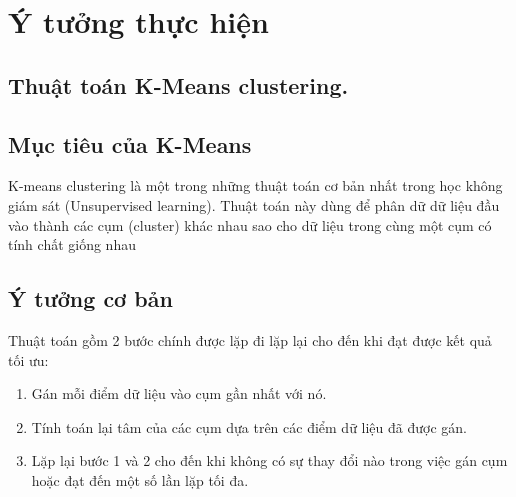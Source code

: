 \section{Ý tưởng thực hiện}
\subsection{Thuật toán K-Means clustering.}
\subsection{Mục tiêu của K-Means}
K-means clustering là một trong những thuật toán cơ bản nhất trong  học không giám sát (Unsupervised learning). Thuật toán này dùng để phân dữ dữ liệu đầu vào thành các cụm (cluster) khác nhau sao cho dữ liệu trong cùng một cụm có tính chất giống nhau \cite{K-meansClustering}

\subsection{Ý tưởng cơ bản}
Thuật toán gồm 2 bước chính được lặp đi lặp lại cho đến khi đạt được kết quả tối ưu:
\begin{enumerate}
	\item Gán mỗi điểm dữ liệu vào cụm gần nhất với nó.
	\item Tính toán lại tâm của các cụm dựa trên các điểm dữ liệu đã được gán.
	\item Lặp lại bước 1 và 2 cho đến khi không có sự thay đổi nào trong việc gán cụm hoặc đạt đến một số lần lặp tối đa.
\end{enumerate}


